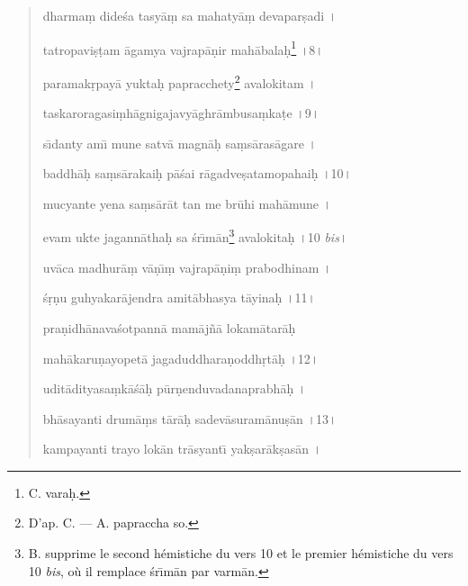 \documentclass[a4paper, 11pt, oneside, french, landscape, twocolumn]{article}
\begin{document}
\begin{quotation}
\bigskip

dharma\d{m} dide\'{s}a tasy\={a}\d{m} sa mahaty\={a}\d{m} devapar\d{s}adi \texthindi{।}

tatropavi\d{s}\d{t}am \={a}gamya vajrap\={a}\d{n}ir mah\={a}bala\d{h}\footnote{C. vara\d{h}.} \texthindi{।}8\texthindi{।}

\bigskip

paramak\d{r}pay\={a} yukta\d{h} papracchety\footnote{D'ap. C. --- A. papraccha so.} avalokitam \texthindi{।}

taskaroragasi\d{m}h\={a}gnigajavy\={a}ghr\={a}mbusa\d{m}ka\d{t}e \texthindi{।}9\texthindi{।}

\bigskip

s\={\i}danty am\={\i} mune satv\={a} magn\={a}\d{h} sa\d{m}s\={a}ras\={a}gare \texthindi{।}

baddh\={a}\d{h} sa\d{m}s\={a}rakai\d{h} p\={a}\'{s}ai r\={a}gadve\d{s}atamopahai\d{h} \texthindi{।}10\texthindi{।}

\bigskip

mucyante yena sa\d{m}s\={a}r\={a}t tan me br\={u}hi mah\={a}mune \texthindi{।}

evam ukte jagann\={a}tha\d{h} sa \'{s}r\={\i}m\={a}n\footnote{B. supprime le second hémistiche du vers 10 et le premier hémistiche du vers 10 \emph{bis}, où il remplace \'{s}r\={\i}m\={a}n par varm\={a}n.} avalokita\d{h} \texthindi{।}10 \emph{bis}\texthindi{।}

\bigskip

uv\={a}ca madhur\={a}\d{m} v\={a}\d{n}\={\i}\d{m} vajrap\={a}\d{n}i\d{m} prabodhinam \texthindi{।}

\'{s}\d{r}\d{n}u guhyakar\={a}jendra amit\={a}bhasya t\={a}yina\d{h} \texthindi{।}11\texthindi{।}

\bigskip

pra\d{n}idh\={a}nava\'{s}otpann\={a} mam\={a}j\~{n}\={a} lokam\={a}tar\={a}\d{h}

mah\={a}karu\d{n}ayopet\={a} jagaduddhara\d{n}oddh\d{r}t\={a}\d{h} \texthindi{।}12\texthindi{।}

\bigskip

udit\={a}dityasa\d{m}k\={a}\'{s}\={a}\d{h} p\={u}r\d{n}enduvadanaprabh\={a}\d{h} \texthindi{।}

bh\={a}sayanti drum\={a}\d{m}s t\={a}r\={a}\d{h} sadev\={a}suram\={a}nu\d{s}\={a}n \texthindi{।}13\texthindi{।}

\bigskip

kampayanti trayo lok\={a}n tr\={a}syant\={\i} yak\d{s}ar\={a}k\d{s}as\={a}n \texthindi{।}


\end{quotation}
\end{document}
